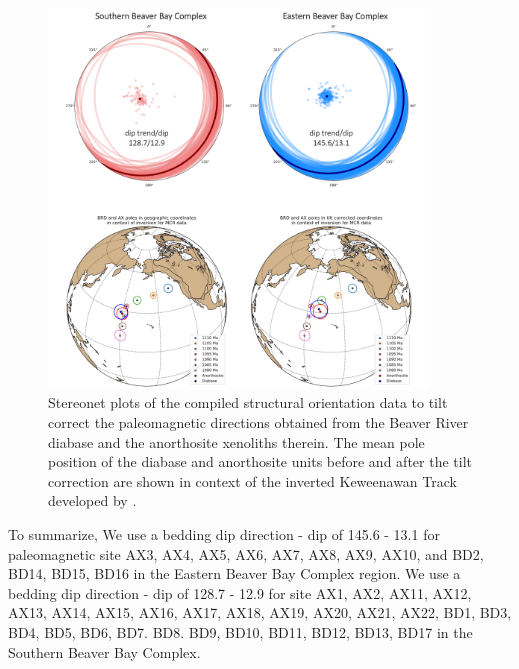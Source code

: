\begin{figure}[h!]
\noindent\includegraphics[width=0.9\textwidth]{figure/Zhang2021/SI_tilt_correction.pdf}
\centering
\caption[Tilt correction analyses for the Beaver River diabase and anorthosite paleomagnetic data]{\footnotesize{Stereonet plots of the compiled structural orientation data to tilt correct the paleomagnetic directions obtained from the Beaver River diabase and the anorthosite xenoliths therein. The mean pole position of the diabase and anorthosite units before and after the tilt correction are shown in context of the inverted Keweenawan Track developed by \cite{Swanson-Hysell2019a}.}}
\label{fig:tilt_correction}
\end{figure}

To summarize, We use a bedding dip direction - dip of 145.6 - 13.1 for paleomagnetic site AX3, AX4, AX5, AX6, AX7, AX8, AX9, AX10, and BD2, BD14, BD15, BD16 in the Eastern Beaver Bay Complex region. We use a bedding dip direction - dip of 128.7 - 12.9 for site AX1, AX2, AX11, AX12, AX13, AX14, AX15, AX16, AX17, AX18, AX19, AX20, AX21, AX22, BD1, BD3, BD4, BD5, BD6, BD7. BD8. BD9, BD10, BD11, BD12, BD13, BD17 in the Southern Beaver Bay Complex.

